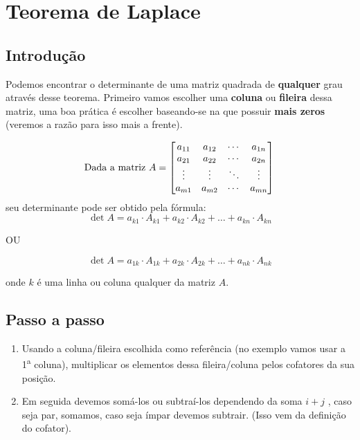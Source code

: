 \chapter{Teorema de Laplace}

\section{Introdução}

Podemos encontrar o determinante de uma matriz quadrada de \textbf{qualquer} grau através desse teorema. Primeiro vamos escolher uma \textbf{coluna} ou \textbf{fileira} dessa matriz, uma boa prática é escolher baseando-se na que possuir \textbf{mais zeros} (veremos a razão para isso mais a frente).

\Example

$$
\text{Dada a matriz }
A=\begin{bmatrix*}[c]
    a_{11} & a_{12} & \cdots & a_{1n} \\
    a_{21} & a_{22} & \cdots & a_{2n} \\
    \vdots  & \vdots  & \ddots & \vdots  \\
    a_{m1} & a_{m2} & \cdots & a_{mn}
\end{bmatrix*} \\
$$
seu determinante pode ser obtido pela fórmula:
$$\det A=a_{k1}\cdot A_{k1}+a_{k2}\cdot A_{k2}+\dots +a_{kn}\cdot A_{kn}$$

\centerline{OU}

$$\det A=a_{1k}\cdot A_{1k}+a_{2k}\cdot A_{2k}+\dots +a_{nk}\cdot A_{nk}$$

onde $k$ é uma linha ou coluna qualquer da matriz $A$.

\section{Passo a passo}

\begin{enumerate}
    \item Usando a coluna/fileira escolhida como referência (no exemplo vamos usar a 1\textsuperscript{a} coluna), multiplicar os elementos dessa fileira/coluna pelos cofatores da sua posição.
    \item Em seguida devemos somá-los ou subtraí-los dependendo da soma $i+j$ , caso seja par, somamos, caso seja ímpar devemos subtrair. (Isso vem da definição do cofator).
\end{enumerate}

\Example

